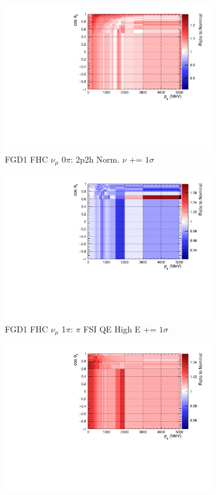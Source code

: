 \begin{figure}
\centering
\begin{subfigure}{.32\textwidth}
  \centering
  \includegraphics[width=0.85\linewidth]{figs/sig/FGD1_numuCC_0pi_2p2h_norm_nu_+1sig.pdf}
  \caption{FGD1 FHC $\nu_{\mu}$ 0$\pi$: 2p2h Norm. $\nu$ += $1\sigma$}
  \label{fig:sigvar_FGD1_numuCC_0pi}
\end{subfigure}
\begin{subfigure}{.32\textwidth}
  \centering
  \includegraphics[width=0.85\linewidth]{figs/sig/FGD1_numuCC_1pi_FEFQEH_+1sig.pdf}
  \caption{FGD1 FHC $\nu_{\mu}$ 1$\pi$: $\pi$ FSI QE High E += $1\sigma$}
  \label{fig:sigvar_FGD1_numuCC_1pi}
\end{subfigure}
\begin{subfigure}{.32\textwidth}
  \centering
  \includegraphics[width=0.85\linewidth]{figs/sig/FGD1_numuCC_other_CC_AGKY_Mult_+1sig.pdf}

\end{subfigure}
\end{figure}

